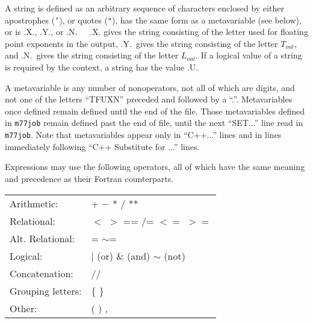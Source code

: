 \documentclass[twoside]{MATH77}
\begin{document}
A string is defined as an arbitrary sequence of characters enclosed by
either apostrophes ({\tt '}), or quotes ({\tt "}), has the same form as a
metavariable (see below), or is .X., .Y., or .N.\ \ \ .X.  gives the
string consisting of the letter used for floating point exponents in the
output, .Y.\ gives the string consisting of the letter $T_{out}$, and
.N.\ gives the string consisting of the letter $L_{out}$.  If a
logical value of a string is required by the context, a string has the
value .U.

A metavariable is any number of nonoperators, not all of which are
digits, and not one of the letters ``TFUXN'' preceded and followed by
a ``.''.  Metavariables once defined remain defined until the end of
the file. Those metavariables defined in {\tt m77job} remain defined
past the end of file, until the next ``SET...'' line read in {\tt
m77job}. Note that metavariables appear only in ``C++...'' lines
and in lines immediately following ``C++ Substitute for ...'' lines.

Expressions may use the following operators, all of which have the same
meaning and precedence as their Fortran counterparts.

\begin{tabular}{ll}
Arithmetic:&        + \hspace{8pt} $-$ \hspace{8pt} * \hspace{8pt} /
 \hspace{8pt} **\\
Relational:&        $<$ \hspace{8pt} $>$ \hspace{8pt} == \hspace{8pt} /=
 \hspace{8pt} $<=$ \hspace{8pt} $>=$\\
Alt. Relational:&         = \hspace{8pt} $\sim $=\\
Logical:&           $|$ (or) \hspace{8pt}  \& (and) \hspace{8pt} $\sim $ (not)\\
Concatenation:&     // \\
Grouping letters:&  $\{$ \hspace{8pt}  $\}$\\
Other:&             ( \hspace{8pt}  ) \hspace{8pt} ,\\
\end{tabular}
\end{document}
